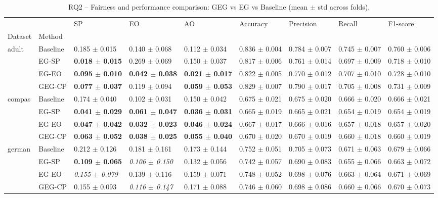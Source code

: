 \begin{table}
\caption{RQ2 -- Fairness and performance comparison: GEG vs EG vs Baseline (mean $\pm$ std across folds).}
\label{tab:rq2_results}
\begin{tabular}{lllllllll}
\toprule
 &  & SP & EO & AO & Accuracy & Precision & Recall & F1-score \\
Dataset & Method &  &  &  &  &  &  &  \\
\midrule
\multirow[t]{4}{*}{adult} & Baseline & 0.185 $\pm$ 0.015 & 0.140 $\pm$ 0.068 & 0.112 $\pm$ 0.034 & 0.836 $\pm$ 0.004 & 0.784 $\pm$ 0.007 & 0.745 $\pm$ 0.007 & 0.760 $\pm$ 0.006 \\
 & EG-SP & \textbf{0.018 $\pm$ 0.015} & 0.269 $\pm$ 0.069 & 0.150 $\pm$ 0.037 & 0.817 $\pm$ 0.006 & 0.761 $\pm$ 0.014 & 0.697 $\pm$ 0.009 & 0.718 $\pm$ 0.010 \\
 & EG-EO & \textbf{0.095 $\pm$ 0.010} & \textbf{0.042 $\pm$ 0.038} & \textbf{0.021 $\pm$ 0.017} & 0.822 $\pm$ 0.005 & 0.770 $\pm$ 0.012 & 0.707 $\pm$ 0.010 & 0.728 $\pm$ 0.010 \\
 & GEG-CP & \textbf{0.077 $\pm$ 0.037} & 0.119 $\pm$ 0.094 & \textbf{0.059 $\pm$ 0.053} & 0.829 $\pm$ 0.007 & 0.790 $\pm$ 0.017 & 0.705 $\pm$ 0.008 & 0.731 $\pm$ 0.009 \\
\cline{1-9}
\multirow[t]{4}{*}{compas} & Baseline & 0.174 $\pm$ 0.040 & 0.102 $\pm$ 0.031 & 0.150 $\pm$ 0.042 & 0.675 $\pm$ 0.021 & 0.675 $\pm$ 0.020 & 0.666 $\pm$ 0.020 & 0.666 $\pm$ 0.021 \\
 & EG-SP & \textbf{0.041 $\pm$ 0.029} & \textbf{0.061 $\pm$ 0.047} & \textbf{0.036 $\pm$ 0.031} & 0.665 $\pm$ 0.019 & 0.665 $\pm$ 0.021 & 0.654 $\pm$ 0.019 & 0.654 $\pm$ 0.019 \\
 & EG-EO & \textbf{0.047 $\pm$ 0.042} & \textbf{0.032 $\pm$ 0.023} & \textbf{0.046 $\pm$ 0.024} & 0.667 $\pm$ 0.017 & 0.666 $\pm$ 0.016 & 0.657 $\pm$ 0.018 & 0.657 $\pm$ 0.020 \\
 & GEG-CP & \textbf{0.063 $\pm$ 0.052} & \textbf{0.038 $\pm$ 0.025} & \textbf{0.055 $\pm$ 0.040} & 0.670 $\pm$ 0.020 & 0.670 $\pm$ 0.019 & 0.660 $\pm$ 0.018 & 0.660 $\pm$ 0.019 \\
\cline{1-9}
\multirow[t]{4}{*}{german} & Baseline & 0.212 $\pm$ 0.126 & 0.181 $\pm$ 0.161 & 0.173 $\pm$ 0.144 & 0.752 $\pm$ 0.051 & 0.705 $\pm$ 0.073 & 0.671 $\pm$ 0.063 & 0.679 $\pm$ 0.066 \\
 & EG-SP & \textbf{0.109 $\pm$ 0.065} & \textit{0.106 $\pm$ 0.150} & 0.132 $\pm$ 0.056 & 0.742 $\pm$ 0.057 & 0.690 $\pm$ 0.083 & 0.655 $\pm$ 0.066 & 0.663 $\pm$ 0.072 \\
 & EG-EO & \textit{0.155 $\pm$ 0.079} & 0.139 $\pm$ 0.116 & 0.159 $\pm$ 0.071 & 0.748 $\pm$ 0.052 & 0.698 $\pm$ 0.076 & 0.663 $\pm$ 0.064 & 0.671 $\pm$ 0.069 \\
 & GEG-CP & 0.155 $\pm$ 0.093 & \textit{0.116 $\pm$ 0.147} & 0.171 $\pm$ 0.088 & 0.746 $\pm$ 0.060 & 0.698 $\pm$ 0.086 & 0.660 $\pm$ 0.066 & 0.670 $\pm$ 0.073 \\
\cline{1-9}
\bottomrule
\end{tabular}
\end{table}
